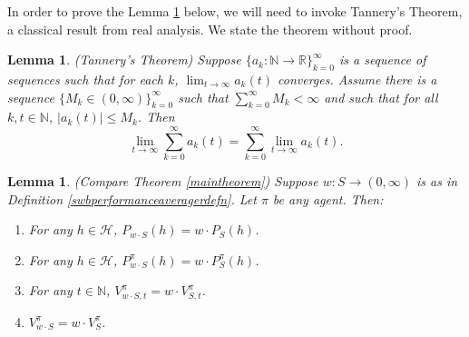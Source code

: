 \documentclass[twoside]{article}
\newtheorem{lemma}[theorem]{Lemma}
\begin{document}
In order to prove the Lemma \ref{envmaintheorem} below, we will need to invoke
Tannery's Theorem, a classical result from real analysis. We state the theorem
without proof.

\begin{lemma}
\label{tannerysthm}
    (Tannery's Theorem)
    Suppose $\{a_k:\mathbb N\to\mathbb R\}_{k=0}^\infty$ is a sequence of sequences
    such that for each $k$, $\lim_{t\to\infty}a_k(t)$ converges.
    Assume there is a sequence $\{M_k\in (0,\infty)\}_{k=0}^\infty$
    such that $\sum_{k=0}^\infty M_k<\infty$ and such that for all $k,t\in\mathbb N$,
    $|a_k(t)|\leq M_k$. Then
    \[
        \lim_{t\to\infty}\sum_{k=0}^\infty a_k(t)
        =
        \sum_{k=0}^\infty\lim_{t\to\infty} a_k(t).
    \]
\end{lemma}

\begin{lemma}
\label{envmaintheorem}
    (Compare Theorem \ref{maintheorem})
    Suppose $w:S\to(0,\infty)$ is as in Definition \ref{swbperformanceaveragerdefn}.
    Let $\pi$ be any agent. Then:
    \begin{enumerate}
        \item
        For any $h\in\mathcal H$,
        $P_{w\cdot S}(h)=w\cdot P_{S}(h)$.
        \item
        For any $h\in\mathcal H$,
        $P^\pi_{w\cdot S}(h)=w\cdot P^\pi_{S}(h)$.
        \item
        For any $t\in\mathbb N$,
        $V^\pi_{w\cdot S,t}=w\cdot V^\pi_{S,t}$.
        \item
        $V^\pi_{w\cdot S}=w\cdot V^\pi_{S}$.
    \end{enumerate}
\end{lemma}
\end{document}
